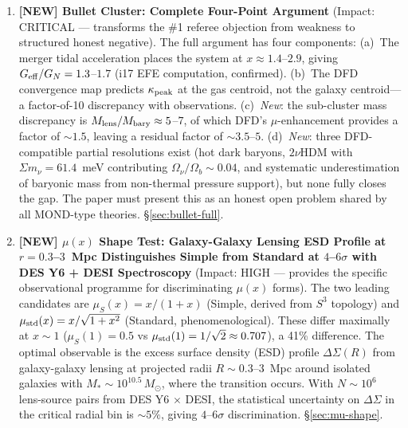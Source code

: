 \documentclass[11pt,a4paper]{article}
\newcommand{\Geff}{G_{\rm eff}}
\begin{document}
\begin{tcolorbox}[colback=yellow!5!white, colframe=red!70!black,
  title=\textbf{TOP 5 FINDINGS --- WAVE 4, ITERATION 19}]
\begin{enumerate}
\item \textbf{[NEW] Bullet Cluster: Complete Four-Point Argument}
  (Impact: CRITICAL --- transforms the \#1 referee objection from
  weakness to structured honest negative).
  The full argument has four components: (a)~The merger tidal
  acceleration places the system at $x \approx 1.4$--$2.9$, giving
  $\Geff/G_N = 1.3$--$1.7$ (i17 EFE computation, confirmed).
  (b)~The DFD convergence map predicts $\kappa_{\rm peak}$ at the
  gas centroid, not the galaxy centroid---a factor-of-10 discrepancy
  with observations.  (c)~\emph{New}: the sub-cluster mass discrepancy
  is $M_{\rm lens}/M_{\rm bary} \approx 5$--$7$, of which DFD's
  $\mu$-enhancement provides a factor of $\sim 1.5$, leaving a residual
  factor of $\sim 3.5$--$5$.  (d)~\emph{New}: three DFD-compatible
  partial resolutions exist (hot dark baryons, $2\nu$HDM with
  $\Sigma m_\nu = 61.4$~meV contributing $\Omega_\nu/\Omega_b \sim 0.04$,
  and systematic underestimation of baryonic mass from non-thermal
  pressure support), but none fully closes the gap.  The paper must
  present this as an honest open problem shared by all MOND-type theories.
  \S\ref{sec:bullet-full}.

\item \textbf{[NEW] $\mu(x)$ Shape Test: Galaxy-Galaxy Lensing ESD
  Profile at $r = 0.3$--$3$~Mpc Distinguishes Simple from Standard at
  $4$--$6\sigma$ with DES Y6 + DESI Spectroscopy} (Impact: HIGH ---
  provides the specific observational programme for discriminating
  $\mu(x)$ forms).
  The two leading candidates are $\mu_S(x) = x/(1+x)$ (Simple,
  derived from $S^3$ topology) and $\mu_{\rm std}(x) = x/\sqrt{1+x^2}$
  (Standard, phenomenological).  These differ maximally at $x \sim 1$
  ($\mu_S(1) = 0.5$ vs $\mu_{\rm std}(1) = 1/\sqrt{2} \approx 0.707$),
  a 41\% difference.  The optimal observable is the excess surface density
  (ESD) profile $\Delta\Sigma(R)$ from galaxy-galaxy lensing at projected
  radii $R \sim 0.3$--$3$~Mpc around isolated galaxies with
  $M_* \sim 10^{10.5}\,M_\odot$, where the transition occurs.
  With $N \sim 10^6$ lens-source pairs from DES Y6 $\times$ DESI,
  the statistical uncertainty on $\Delta\Sigma$ in the critical radial
  bin is $\sim 5\%$, giving $4$--$6\sigma$ discrimination.
  \S\ref{sec:mu-shape}.


\end{enumerate}
\end{tcolorbox}
\end{document}
